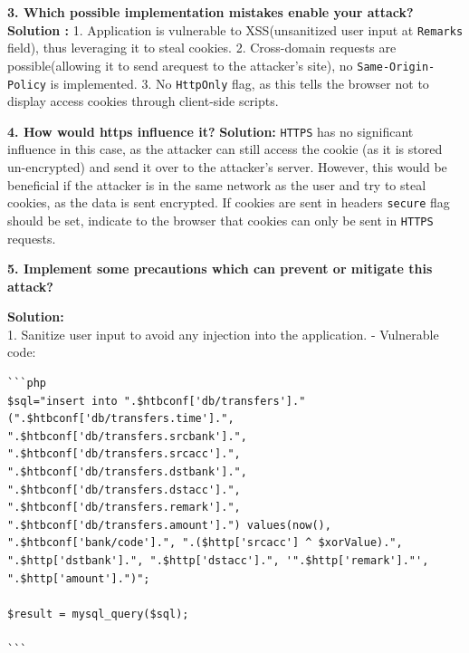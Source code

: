 \textbf{3. Which possible implementation mistakes enable your attack?}
\textbf{Solution :} 1. Application is vulnerable to XSS(unsanitized user
input at \texttt{Remarks} field), thus leveraging it to steal cookies.
2. Cross-domain requests are possible(allowing it to send arequest to
the attacker's site), no \texttt{Same-Origin-Policy} is implemented. 3.
No \texttt{HttpOnly} flag, as this tells the browser not to display
access cookies through client-side scripts.

\textbf{4. How would https influence it?} \textbf{Solution:}
\texttt{HTTPS} has no significant influence in this case, as the
attacker can still access the cookie (as it is stored un-encrypted) and
send it over to the attacker's server. However, this would be beneficial
if the attacker is in the same network as the user and try to steal
cookies, as the data is sent encrypted. If cookies are sent in headers
\texttt{secure} flag should be set, indicate to the browser that cookies
can only be sent in \texttt{HTTPS} requests.

\textbf{5. Implement some precautions which can prevent or mitigate this
attack?}

\textbf{Solution:}\\
1. Sanitize user input to avoid any injection into the application. -
Vulnerable code:

\begin{verbatim}
```php
$sql="insert into ".$htbconf['db/transfers']." (".$htbconf['db/transfers.time'].", ".$htbconf['db/transfers.srcbank'].", ".$htbconf['db/transfers.srcacc'].", ".$htbconf['db/transfers.dstbank'].", ".$htbconf['db/transfers.dstacc'].", ".$htbconf['db/transfers.remark'].", ".$htbconf['db/transfers.amount'].") values(now(), ".$htbconf['bank/code'].", ".($http['srcacc'] ^ $xorValue).", ".$http['dstbank'].", ".$http['dstacc'].", '".$http['remark']."', ".$http['amount'].")";  

$result = mysql_query($sql);

```
\end{verbatim}

